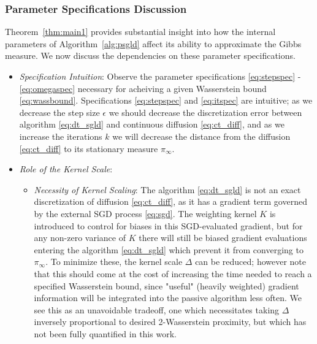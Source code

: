 \documentclass[journal,onecolumn]{IEEEtran}
\newcommand{\step}{\epsilon}
\newcommand{\gibbs}{\ids_{\infty}}
\newcommand{\K}{K}
\newcommand{\ids}{\pi}
\begin{document}
\subsubsection{Parameter Specifications Discussion}
{\color{black} Theorem~\ref{thm:main1} provides substantial insight into how the internal parameters of Algorithm~\ref{alg:psgld} affect its ability to approximate the Gibbs measure. We now discuss the dependencies on these parameter specifications.}
\begin{itemize}
    \item[-] \textit{Specification Intuition}: Observe the parameter specifications \eqref{eq:stepspec} - \eqref{eq:omegaspec} necessary for acheiving a given Wasserstein bound \eqref{eq:wassbound}. Specifications \eqref{eq:stepspec} and \eqref{eq:itspec} are intuitive; as we decrease the step size $\step$ we should decrease the discretization error between algorithm \eqref{eq:dt_sgld} and continuous diffusion \eqref{eq:ct_diff}, and as we increase the iterations $k$ we will decrease the distance from the diffusion \eqref{eq:ct_diff} to its stationary measure $\gibbs$. 

    \item[-] \textit{Role of the Kernel Scale}: 
    \begin{itemize}
        \item[-] \textit{Necessity of Kernel Scaling}: The algorithm \eqref{eq:dt_sgld} is not an exact discretization of diffusion \eqref{eq:ct_diff}, as it has a gradient term governed by the external SGD process \eqref{eq:sgd}. The weighting kernel $\K$ is introduced to control for biases in this SGD-evaluated gradient, but for any non-zero variance of $\K$ there will still be biased gradient evaluations entering the algorithm \eqref{eq:dt_sgld} which prevent it from converging to $\gibbs$. To minimize these, the kernel scale $\Delta$ can be reduced; however note that this should come at the cost of increasing the time needed to reach a specified Wasserstein bound, since "useful" {\color{black}(heavily weighted)} gradient information will be integrated into the passive algorithm less often. We see this as an unavoidable tradeoff, one which necessitates taking $\Delta$ {\color{black}inversely proportional to desired 2-Wasserstein proximity}, but which has not been fully quantified in this work.


\end{itemize}
\end{itemize}
\end{document}
